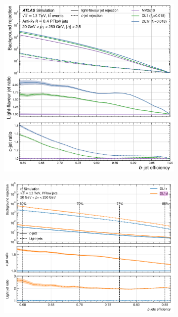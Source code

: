 \begin{figure}[h]
    \centering
    \begin{subfigure}{0.435\linewidth}
        \centering
        \includegraphics[width=\linewidth]{Figures/cern_atlas/dl1r.png}
        \caption{}
        \label{fig:dl1r}
    \end{subfigure}
    \begin{subfigure}{0.555\linewidth}
        \centering
        \includegraphics[width=\linewidth]{Figures/cern_atlas/dl1d.png}

\end{subfigure}
\end{figure}

